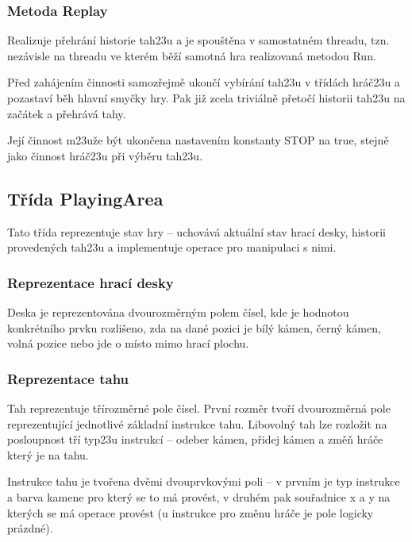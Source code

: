 \documentclass{article}
\begin{document}
\subsubsection{Metoda Replay}
Realizuje p\v{r}ehr\'an\'i historie tah\accent23u a je spou\v{s}t\v{e}na v samostatn\'em threadu, tzn. nez\'avisle na threadu ve kter\'em b\v{e}\v{z}\'i samotn\'a hra realizovan\'a metodou Run.\medskip

P\v{r}ed zah\'ajen\'im \v{c}innosti samoz\v{r}ejm\v{e} ukon\v{c}\'i vyb\'ir\'an\'i tah\accent23u v t\v{r}\'id\'ach hr\'a\v{c}\accent23u a pozastav\'i b\v{e}h hlavn\'i smy\v{c}ky hry. Pak ji\v{z} zcela trivi\'aln\v{e} p\v{r}eto\v{c}\'i historii tah\accent23u na za\v{c}\'atek a p\v{r}ehr\'av\'a tahy.\medskip

Jej\'i \v{c}innost m\accent23u\v{z}e b\'yt ukon\v{c}ena nastaven\'im konstanty STOP na true, stejn\v{e} jako \v{c}innost hr\'a\v{c}\accent23u p\v{r}i v\'yb\v{e}ru tah\accent23u.



\subsection{T\v{r}\'ida PlayingArea}
Tato t\v{r}\'ida reprezentuje stav hry – uchov\'av\'a aktu\'aln\'i stav hrac\'i desky, historii proveden\'ych tah\accent23u a implementuje operace pro manipulaci s nimi.

\subsubsection{Reprezentace hrac\'i desky}
Deska je reprezentov\'ana dvourozm\v{e}rn\'ym polem \v{c}\'isel, kde je hodnotou konkr\'etn\'iho prvku rozli\v{s}eno, zda na dan\'e pozici je b\'il\'y k\'amen, \v{c}ern\'y k\'amen, voln\'a pozice nebo jde o m\'isto mimo hrac\'i plochu.

\subsubsection{Reprezentace tahu}
Tah reprezentuje t\v{r}\'irozm\v{e}rn\'e pole \v{c}\'isel. Prvn\'i rozm\v{e}r tvo\v{r}\'i dvourozm\v{e}rn\'a pole reprezentuj\'ic\'i jednotliv\'e z\'akladn\'i instrukce tahu. Libovoln\'y tah lze rozlo\v{z}it na posloupnost t\v{r}\'i typ\accent23u instrukc\'i – odeber k\'amen, p\v{r}idej k\'amen a zm\v{e}\v{n} hr\'a\v{c}e kter\'y je na tahu.\medskip

Instrukce tahu je tvo\v{r}ena dv\v{e}mi dvouprvkov\'ymi poli – v prvn\'im je typ instrukce a barva kamene pro kter\'y se to m\'a prov\'est, v druh\'em pak sou\v{r}adnice x a y na kter\'ych se m\'a operace prov\'est (u instrukce pro zm\v{e}nu hr\'a\v{c}e je pole logicky pr\'azdn\'e).
\end{document}
